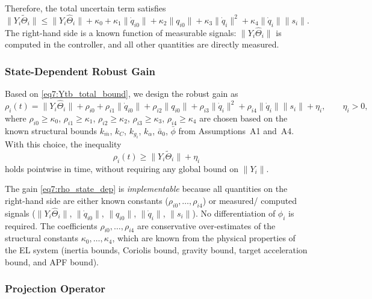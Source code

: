 Therefore, the total uncertain term satisfies
\begin{equation}
	\|Y_i\tilde{\Theta}_i\| \le
	\|Y_i\hat{\Theta}_i\| + \kappa_0 + \kappa_1\|\dot{q}_{i0}\| + \kappa_2\|q_{i0}\|
	+ \kappa_3\|\dot{q}_i\|^2 + \kappa_4\|\dot{q}_i\|\|s_i\|.
	\label{eq7:Ytb_total_bound}
\end{equation}
The right-hand side is a known function of measurable signals: $\|Y_i\hat{\Theta}_i\|$ is
computed in the controller, and all other quantities are directly measured.

\subsubsection{State-Dependent Robust Gain}

Based on \eqref{eq7:Ytb_total_bound}, we design the robust gain as
\begin{equation}
	\rho_i(t) = \|Y_i\hat{\Theta}_i\| + \rho_{i0} + \rho_{i1}\|\dot{q}_{i0}\|
		+ \rho_{i2}\|q_{i0}\| + \rho_{i3}\|\dot{q}_i\|^2 + \rho_{i4}\|\dot{q}_i\|\|s_i\| + \eta_i,
	\qquad \eta_i > 0,
	\label{eq7:rho_state_dep}
\end{equation}
where $\rho_{i0} \ge \kappa_0$, $\rho_{i1} \ge \kappa_1$, $\rho_{i2} \ge \kappa_2$,
$\rho_{i3} \ge \kappa_3$, $\rho_{i4} \ge \kappa_4$ are chosen based on the known
structural bounds $k_{\overline m}$, $k_C$, $k_{g_i}$, $k_\alpha$, $\bar{a}_0$, $\bar{\phi}$
from Assumptions~A1 and~A4.  With this choice, the inequality
\begin{equation}
	\rho_i(t) \ge \|Y_i\tilde{\Theta}_i\| + \eta_i
	\label{eq7:rho_ineq}
\end{equation}
holds pointwise in time, without requiring any global bound on $\|Y_i\|$.

\begin{remark}
	The gain \eqref{eq7:rho_state_dep} is \emph{implementable} because all quantities
	on the right-hand side are either known constants ($\rho_{i0},\dots,\rho_{i4}$) or
	measured/ computed signals ($\|Y_i\hat{\Theta}_i\|$, $\|\dot{q}_{i0}\|$, $\|q_{i0}\|$,
	$\|\dot{q}_i\|$, $\|s_i\|$).  No differentiation of $\phi_i$ is required.  The
	coefficients $\rho_{i0},\dots,\rho_{i4}$ are conservative over-estimates of the
	structural constants $\kappa_0,\dots,\kappa_4$, which are known from the physical
	properties of the EL system (inertia bounds, Coriolis bound, gravity bound, target
	acceleration bound, and APF bound).
\end{remark}

\subsubsection{Projection Operator}

